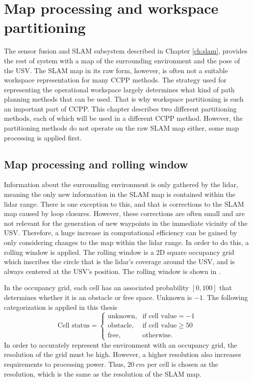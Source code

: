 \chapter{Map processing and workspace partitioning} \label{ch:partition}

The sensor fusion and SLAM subsystem described in Chapter \ref{ch:slam}, provides the rest of system with a map of the surrounding environment and the pose of the USV. The SLAM map in its raw form, however, is often not a suitable workspace representation for many CCPP methods. The strategy used for representing the operational workspace largely determines what kind of path planning methods that can be used. That is why workspace partitioning is such an important part of CCPP. This chapter describes two different partitioning methods, each of which will be used in a different CCPP method. However, the partitioning methods do not operate on the raw SLAM map either, some map processing is applied first.

\section{Map processing and rolling window} \label{sec:map_processing}

Information about the surrounding environment is only gathered by the lidar, meaning the only new information in the SLAM map is contained within the lidar range. There is one exception to this, and that is corrections to the SLAM map caused by loop closures. However, these corrections are often small and are not relevant for the generation of new waypoints in the immediate vicinity of the USV. Therefore, a huge increase in computational efficiency can be gained by only considering changes to the map within the lidar range. In order to do this, a rolling window is applied. The rolling window is a 2D square occupancy grid which inscribes the circle that is the lidar's coverage around the USV, and is always centered at the USV's position. The rolling window is shown in .

In the occupancy grid, each cell has an associated probability $[0, 100]$ that determines whether it is an obstacle or free space. Unknown is $-1$. The following categorization is applied in this thesis
\begin{equation}
\text{Cell status} = 
\begin{cases}
\text{unknown}, & \text{if cell value} = -1 \\ 
\text{obstacle}, & \text{if cell value} \geq 50 \\
\text{free}, & \text{otherwise.}
\end{cases}
\end{equation}
In order to accurately represent the environment with an occupancy grid, the resolution of the grid must be high. However, a higher resolution also increases requirements to processing power. Thus, $\SI{20}{cm}$ per cell is chosen as the resolution, which is the same as the resolution of the SLAM map. 

